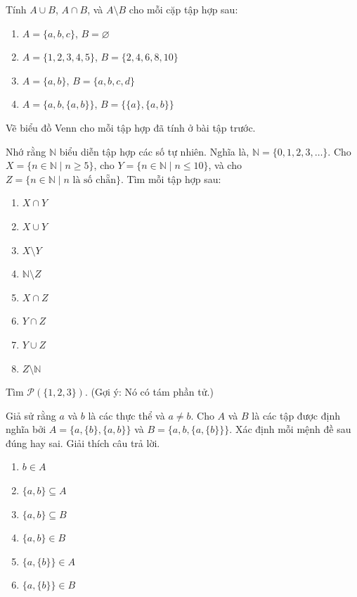 \begin{exercise}
Tính $A \cup B$, $A \cap B$, và $A \setminus B$ cho mỗi cặp tập hợp sau:
\begin{enumerate}[label=\alph*)]
\item $A = \{a, b, c\}$, $B = \varnothing$
\item $A = \{1, 2, 3, 4, 5\}$, $B = \{2, 4, 6, 8, 10\}$
\item $A = \{a, b\}$, $B = \{a, b, c, d\}$
\item $A = \{a, b, \{a, b\}\}$, $B = \{\{a\}, \{a, b\}\}$
\end{enumerate}
\end{exercise}

\begin{exercise}
Vẽ biểu đồ Venn cho mỗi tập hợp đã tính ở bài tập trước.
\end{exercise}

\begin{exercise}
Nhớ rằng $\mathbb{N}$ biểu diễn tập hợp các số tự nhiên. Nghĩa là, $\mathbb{N} = \{0, 1, 2, 3, \ldots\}$. Cho $X = \{n \in \mathbb{N} \mid n \geq 5\}$, cho $Y = \{n \in \mathbb{N} \mid n \leq 10\}$, và cho $Z = \{n \in \mathbb{N} \mid n \text{ là số chẵn}\}$. Tìm mỗi tập hợp sau:
\begin{enumerate}[label=\alph*)]
\item $X \cap Y$
\item $X \cup Y$
\item $X \setminus Y$
\item $\mathbb{N} \setminus Z$
\item $X \cap Z$
\item $Y \cap Z$
\item $Y \cup Z$
\item $Z \setminus \mathbb{N}$
\end{enumerate}
\end{exercise}

\begin{exercise}
Tìm $\mathcal{P}(\{1, 2, 3\})$. (Gợi ý: Nó có tám phần tử.)
\end{exercise}

\begin{exercise}
Giả sử rằng $a$ và $b$ là các thực thể và $a \neq b$. Cho $A$ và $B$ là các tập được định nghĩa bởi $A = \{a, \{b\}, \{a, b\}\}$ và $B = \{a, b, \{a, \{b\}\}\}$. Xác định mỗi mệnh đề sau đúng hay sai. Giải thích câu trả lời.
\begin{enumerate}[label=\alph*)]
\item $b \in A$
\item $\{a, b\} \subseteq A$
\item $\{a, b\} \subseteq B$
\item $\{a, b\} \in B$
\item $\{a, \{b\}\} \in A$
\item $\{a, \{b\}\} \in B$
\end{enumerate}
\end{exercise}


